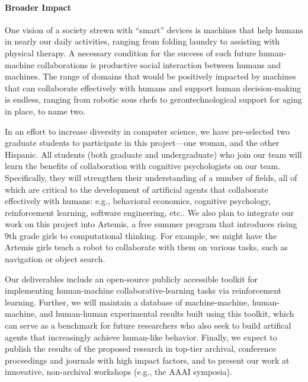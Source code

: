 

\vspace{\up}
\paragraph{Broader Impact}

One vision of a society strewn with ``smart'' devices is
machines that help humans in nearly our daily activities, 
ranging from folding laundry to assisting with physical therapy.
A necessary condition for the success of such future human-machine collaborations 
is productive social interaction between humans and machines.  
%
The range of domains that would be positively impacted by machines
that can collaborate effectively with humans and support human
decision-making is endless, ranging from robotic sous chefs to
gerontechnological support for aging in place, to name two.


In an effort to increase diversity in computer science, we have
pre-selected two graduate students to participate in this
project---one woman, and the other Hispanic.  All students (both
graduate and undergraduate) who join our team will learn the benefits
of collaboration with cognitive psychologists on our team.  Specifically, they will
strengthen their understanding of a number of fields, all of which are
critical to the development of artificial agents that collaborate
effectively with humans: e.g., behavioral economics, cognitive
psychology, reinforcement learning, software engineering, etc..
%
We also plan to integrate our work on this project into Artemis, a
free summer program that introduces rising 9th grade girls to
computational thinking.
For example, we might have the Artemis girls teach a robot to
collaborate with them on various tasks, such as navigation or object search.

Our deliverables include an open-source publicly accessible toolkit
for implementing human-machine collaborative-learning tasks via
reinforcement learning. Further, we will maintain a database of
machine-machine, human-machine, and human-human experimental results
built using this toolkit, which can serve as a benchmark for future
researchers who also seek to build artifical agents that increasingly
achieve human-like behavior.
%
Finally, we expect to publish the results of the proposed research in
top-tier archival, conference proceedings and journals with high
impact factors, and to present our work at innovative, non-archival
workshops (e.g., the AAAI symposia).

